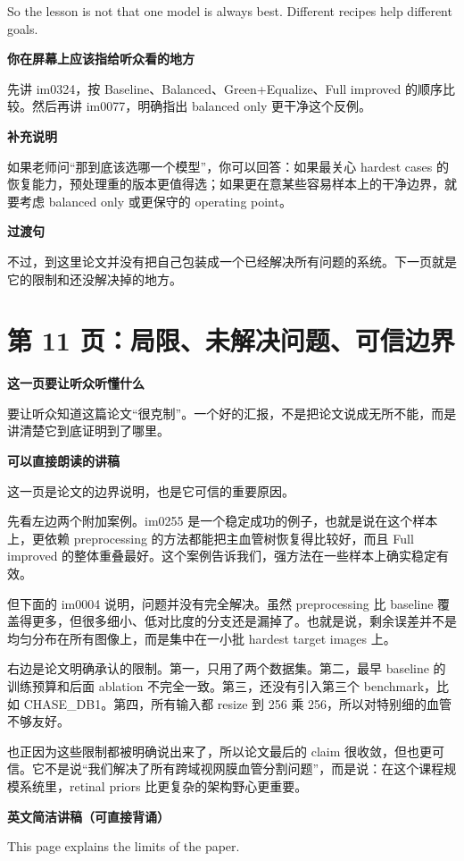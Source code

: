 \documentclass[12pt,a4paper]{ctexart}
\newcommand{\EnglishScriptHeading}{\textbf{\color{AccentGreen}英文简洁讲稿（可直接背诵）}}
\begin{document}
So the lesson is not that one model is always best. Different recipes help different goals.

\textbf{你在屏幕上应该指给听众看的地方}

先讲 im0324，按 Baseline、Balanced、Green+Equalize、Full improved 的顺序比较。然后再讲 im0077，明确指出 balanced only 更干净这个反例。

\textbf{补充说明}

如果老师问“那到底该选哪一个模型”，你可以回答：如果最关心 hardest cases 的恢复能力，预处理重的版本更值得选；如果更在意某些容易样本上的干净边界，就要考虑 balanced only 或更保守的 operating point。

\textbf{过渡句}

不过，到这里论文并没有把自己包装成一个已经解决所有问题的系统。下一页就是它的限制和还没解决掉的地方。

\section*{第 11 页：局限、未解决问题、可信边界}

\textbf{这一页要让听众听懂什么}

要让听众知道这篇论文“很克制”。一个好的汇报，不是把论文说成无所不能，而是讲清楚它到底证明到了哪里。

\textbf{可以直接朗读的讲稿}

这一页是论文的边界说明，也是它可信的重要原因。

先看左边两个附加案例。im0255 是一个稳定成功的例子，也就是说在这个样本上，更依赖 preprocessing 的方法都能把主血管树恢复得比较好，而且 Full improved 的整体重叠最好。这个案例告诉我们，强方法在一些样本上确实稳定有效。

但下面的 im0004 说明，问题并没有完全解决。虽然 preprocessing 比 baseline 覆盖得更多，但很多细小、低对比度的分支还是漏掉了。也就是说，剩余误差并不是均匀分布在所有图像上，而是集中在一小批 hardest target images 上。

右边是论文明确承认的限制。第一，只用了两个数据集。第二，最早 baseline 的训练预算和后面 ablation 不完全一致。第三，还没有引入第三个 benchmark，比如 CHASE\_DB1。第四，所有输入都 resize 到 256 乘 256，所以对特别细的血管不够友好。

也正因为这些限制都被明确说出来了，所以论文最后的 claim 很收敛，但也更可信。它不是说“我们解决了所有跨域视网膜血管分割问题”，而是说：在这个课程规模系统里，retinal priors 比更复杂的架构野心更重要。

\EnglishScriptHeading

This page explains the limits of the paper.
\end{document}
